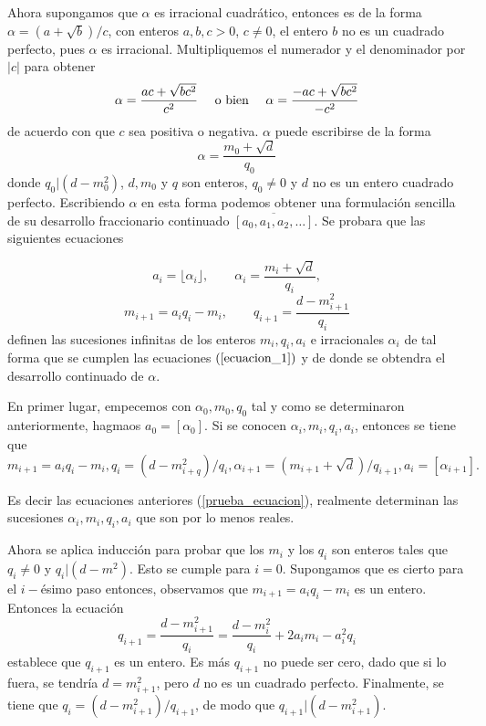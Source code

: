 \documentclass[11pt, article]{article}
\begin{document}
    Ahora supongamos que $\alpha$ es irracional cuadrático, entonces es de la forma $\alpha=(a+\sqrt{b})/c$, con enteros $a,b,c>0$, $c\not=0$, el entero $b$ no es un cuadrado perfecto, pues  $\alpha$ es irracional. Multipliquemos el numerador y el denominador por $|c|$ para obtener 
        \[
        \alpha = \dfrac{ac + \sqrt{bc^2}}{c^2} \quad \textnormal{ o bien } \quad \alpha=\dfrac{-ac+\sqrt{bc^2}}{-c^2}
        \]
    de acuerdo con que $c$ sea positiva o negativa. $\alpha$ puede escribirse de la forma
        \[
        \alpha = \dfrac{m_0+\sqrt{d}}{q_0}
        \]
    donde $q_0|(d-m_0^2)$, $d,m_0$ y $q$ son enteros, $q_0\not=0$ y $d$ no es un entero cuadrado perfecto. Escribiendo $\alpha$ en esta forma podemos obtener una formulación sencilla de su desarrollo fraccionario continuado $\overline{[a_0,a_1,a_2,\dots]}$. Se probara que las siguientes ecuaciones 

        \begin{equation}
        a_i= \lfloor \alpha_i \rfloor, \qquad \alpha_i=\dfrac{m_i+\sqrt{d}}{q_i}, \label{prueba_ecuacion}
        \end{equation}
        \[
        m_{i+1}=a_iq_i-m_i, \qquad q_{i+1}=\dfrac{d-m_{i+1}^2}{q_i}
        \] 
    definen las sucesiones infinitas de los enteros $m_i,q_i,a_i$ e irracionales $\alpha_i$ de tal forma que se cumplen las ecuaciones $(\ref{ecuacion_1})$ y de donde se obtendra el desarrollo continuado de $\alpha$.

    En primer lugar, empecemos con $\alpha_0,m_0,q_0$ tal y como se determinaron anteriormente,  hagmaos $a_0=[\alpha_0]$. Si se conocen $\alpha_i,m_i,q_i,a_i$, entonces se tiene que 
        \[
         m_{i+1}=a_iq_i - m_i, q_i=(d-m_{i+q}^2)/q_i, \alpha_{i+1}=(m_{i+1} + \sqrt{d})/q_{i+1}, a_i=[\alpha_{i+1}].
         \]
    
    Es decir las ecuaciones anteriores (\ref{prueba_ecuacion}), realmente determinan las sucesiones $\alpha_i,m_i,q_i,a_i$ que son por lo menos reales.
    
    Ahora se aplica inducción para probar que los $m_i$ y los $q_i$ son enteros tales que $q_i\not=0$ y $q_i|(d-m^2)$. Esto se cumple para $i=0$. Supongamos que es cierto para el $i-$ésimo paso entonces, observamos que $m_{i+1}=a_iq_i-m_i$ es un entero. Entonces la ecuación 
         \[
        q_{i+1}=\dfrac{d-m_{i+1}^2}{q_i}=\dfrac{d-m_i^2}{q_i} + 2a_im_i-a_i^2q_i
        \]
    establece que $q_{i+1}$ es un entero. Es más $q_{i+1}$ no puede ser cero, dado que si lo fuera, se tendría $d=m^2_{i+1}$, pero $d$ no es un cuadrado perfecto. Finalmente, se tiene que $q_i=(d-m_{i+1}^2)/q_{i+1}$, de modo que $q_{i+1}|(d-m_{i+1}^2)$.
    
\end{document}
